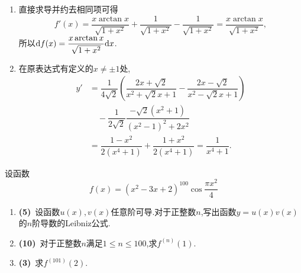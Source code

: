 \documentclass{ctexart}
\begin{document}
\begin{solution}
\begin{enumerate}[label=\textbf{(\arabic*)}]
        \item 直接求导并约去相同项可得
            \[f'(x)=\dfrac{x\arctan x}{\sqrt{1+x^2}}+\dfrac1{\sqrt{1+x^2}}-\dfrac1{\sqrt{1+x^2}}
            =\dfrac{x\arctan x}{\sqrt{1+x^2}},\]
            所以$\mathrm{d} f(x)=\dfrac{x\arctan x}{\sqrt{1+x^2}}\mathrm{d} x$.
        \item 在原表达式有定义的$x\neq\pm1$处,
            \[\begin{aligned}
              y'&=\dfrac1{4\sqrt2}\left(\dfrac{2x+\sqrt2}{x^2+\sqrt2x+1}-\dfrac{2x-\sqrt2}{x^2-\sqrt2x+1}\right)\\
                 &\quad-\dfrac1{2\sqrt2}\dfrac{-\sqrt2(x^2+1)}{(x^2-1)^2+2x^2}\\
                &=\dfrac{1-x^2}{2(x^4+1)}+\dfrac{1+x^2}{2(x^4+1)}=\dfrac1{x^4+1}.
            \end{aligned}\]
    \end{enumerate}
\end{solution}
\begin{problem}[3.(18\songti{分})]
    设函数$$f(x)=\left(x^2-3x+2\right)^{100}\cos\dfrac{\pi x^2}{4}$$
    \begin{enumerate}[label=\textbf{(\arabic*)}]
        \item \textbf{(5)}\ 设函数$u(x),v(x)$任意阶可导.对于正整数$n$,写出函数$y=u(x)v(x)$的$n$阶导数的Leibniz公式.
        \item \textbf{(10)}\ 对于正整数$n$满足$1\leqslant n\leqslant100$,求$f^{(n)}(1)$.
        \item \textbf{(3)}\ 求$f^{(101)}(2)$.
    \end{enumerate}
\end{problem}
\end{document}
